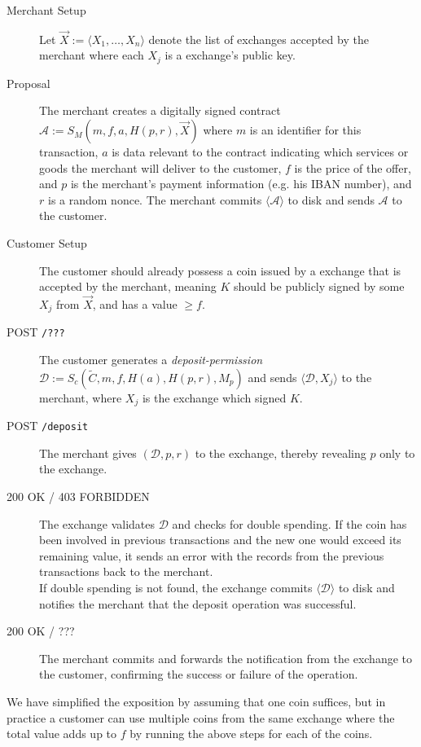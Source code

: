 \documentclass{llncs}
\begin{document}
\begin{description}
\item[Merchant Setup] %
  Let $\vec{X} := \langle X_1, \ldots, X_n \rangle$ denote the list of
  exchanges accepted by the merchant where each $X_j$ is a exchange's
  public key.
\item[Proposal]
  The merchant creates a digitally signed contract
    $\mathcal{A} := S_M(m, f, a, H(p, r), \vec{X})$
  where $m$ is an identifier for this transaction, $a$ is data relevant
  to the contract indicating which services or goods the merchant will
  deliver to the customer, $f$ is the price of the offer, and
  $p$ is the merchant's payment information (e.g. his IBAN number), and
  $r$ is a random nonce.  The merchant commits $\langle \mathcal{A} \rangle$
  to disk and sends $\mathcal{A}$ to the customer.
\item[Customer Setup]
  The customer should already possess a coin issued by a exchange that is
  accepted by the merchant, meaning $K$ should be publicly signed by
  some $X_j$ from $\vec{X}$, and has a value $\geq f$.
\item[POST {\tt /???}] \label{deposit}
  The customer generates a \emph{deposit-permission}
    $\mathcal{D} := S_c(\widetilde{C}, m, f, H(a), H(p,r), M_p)$
  and sends $\langle \mathcal{D}, X_j\rangle$ to the merchant,
  where $X_j$ is the exchange which signed $K$.
\item[POST {\tt/deposit}]
  The merchant gives $(\mathcal{D}, p, r)$ to the exchange, thereby
  revealing $p$ only to the exchange.
\item[200 OK / 403 FORBIDDEN]
  The exchange validates $\mathcal{D}$ and checks for double spending.
  If the coin has been involved in previous transactions and the new
  one would exceed its remaining value, it sends an error
  with the records from the previous transactions back to the merchant. \\
  If double spending is not found, the exchange commits $\langle \mathcal{D} \rangle$ to disk
  and notifies the merchant that the deposit operation was successful.
\item[200 OK / ???]
  The merchant commits and forwards the notification from the exchange to the
  customer, confirming the success or failure of the operation.
\end{description}

We have simplified the exposition by assuming that one coin suffices,
but in practice a customer can use multiple coins from the same
exchange where the total value adds up to $f$ by running the above
steps for each of the coins.
\end{document}
